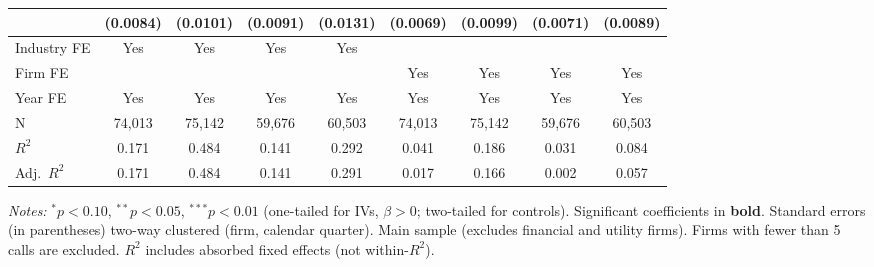 \documentclass[11pt,a4paper]{article}
\begin{document}
\begin{table}[htbp]
\begin{tabular}{lcccccccc}
 & (0.0084) & (0.0101) & (0.0091) & (0.0131) & (0.0069) & (0.0099) & (0.0071) & (0.0089) \\
\midrule
Industry FE & Yes & Yes & Yes & Yes &  &  &  &  \\
Firm FE &  &  &  &  & Yes & Yes & Yes & Yes \\
Year FE & Yes & Yes & Yes & Yes & Yes & Yes & Yes & Yes \\
\midrule
N & 74,013 & 75,142 & 59,676 & 60,503 & 74,013 & 75,142 & 59,676 & 60,503 \\
$R^2$ & 0.171 & 0.484 & 0.141 & 0.292 & 0.041 & 0.186 & 0.031 & 0.084 \\
Adj.~$R^2$ & 0.171 & 0.484 & 0.141 & 0.291 & 0.017 & 0.166 & 0.002 & 0.057 \\
\bottomrule
\end{tabular}
\begin{minipage}{\linewidth}
\vspace{2pt}\scriptsize
\textit{Notes:} $^{*}p<0.10$, $^{**}p<0.05$, $^{***}p<0.01$ (one-tailed for IVs, $\beta > 0$; two-tailed for controls).
 Significant coefficients in \textbf{bold}.
 Standard errors (in parentheses) two-way clustered (firm, calendar quarter).
 Main sample (excludes financial and utility firms). Firms with fewer than 5 calls are excluded.
 $R^2$ includes absorbed fixed effects (not within-$R^2$).
\end{minipage}
\end{table}
\clearpage
\end{document}
